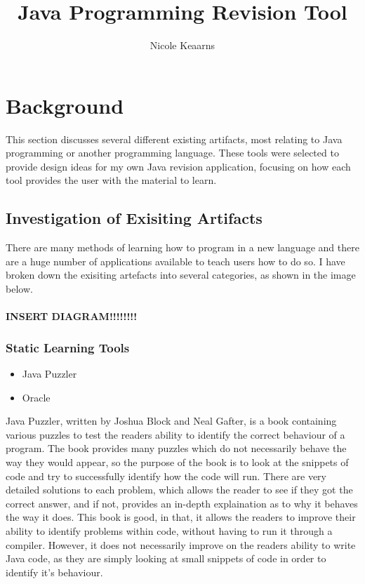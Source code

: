 \documentclass{article}
\begin{document}
\title{Java Programming Revision Tool}
\author{Nicole Keaarns}
\maketitle
\tableofcontents

\newpage

\section{Background}

This section discusses several different existing artifacts, most relating to Java programming or another programming language. These tools were selected to provide design ideas for my own Java revision application, focusing on how each tool provides the user with the material to learn.

\subsection{Investigation of Exisiting Artifacts}

There are many methods of learning how to program in a new language and there are a huge number of applications available to teach users how to do so. I have broken down the exisiting artefacts into several categories, as shown in the image below.\\
\\
\textbf{INSERT DIAGRAM!!!!!!!!}


\subsubsection{Static Learning Tools}

\begin{itemize}
\item Java Puzzler
\item Oracle
\end{itemize}

Java Puzzler, written by Joshua Block and Neal Gafter, is a book containing various puzzles to test the readers ability to identify the correct behaviour of a program. The book provides many puzzles which do not necessarily behave the way they would appear, so the purpose of the book is to look at the snippets of code and try to successfully identify how the code will run. There are very detailed solutions to each problem, which allows the reader to see if they got the correct answer, and if not, provides an in-depth explaination as to why it behaves the way it does. This book is good, in that, it allows the readers to improve their ability to identify problems within code, without having to run it through a compiler. However, it does not necessarily improve on the readers ability to write Java code, as they are simply looking at small snippets of code in order to identify it's behaviour. 
\end{document}
